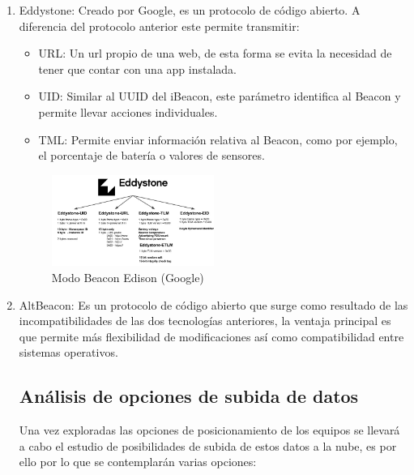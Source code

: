 \documentclass[paper=a4, fontsize=11pt,twoside]{scrartcl}	%
\begin{document}
\begin{enumerate}
\begin{center}
\begin{figure}[ht]
                        \label{fig:mesh2}
                    \end{figure}
                \end{center}
                \item Eddystone: Creado por Google, es un protocolo de código abierto. A diferencia del protocolo anterior este 
                permite transmitir:
                \begin{itemize}
                    \item URL: Un url propio de una web, de esta forma se evita la necesidad de tener que contar con una app instalada.
                    \item UID: Similar al UUID del iBeacon, este parámetro identifica al Beacon y permite llevar acciones individuales.
                    \item TML: Permite enviar información relativa al Beacon, como por ejemplo, el porcentaje de batería o valores de sensores.
                \end{itemize}
                \begin{center}
                    \begin{figure}[ht]
                        \centering
                        \includegraphics[width=0.5\textwidth]{tipos_beacon_edison.PNG}
                        \caption{Modo Beacon Edison (Google) }
                        \label{fig:mesh3}
                    \end{figure}
                \end{center}
                \item AltBeacon: Es un protocolo de código abierto que surge como resultado de las incompatibilidades de las dos 
                tecnologías anteriores, la ventaja principal es que permite más flexibilidad de modificaciones así como compatibilidad 
                entre sistemas operativos.
    \subsection{Análisis de opciones de subida de datos}
        Una vez exploradas las opciones de posicionamiento de los equipos se llevará a cabo el estudio de posibilidades de subida de estos datos
        a la nube, es por ello por lo que se contemplarán varias opciones:

\end{enumerate}
\end{document}

